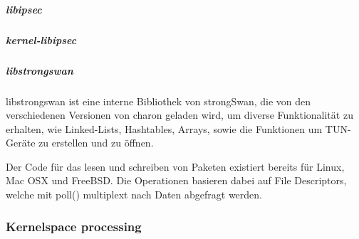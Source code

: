 \subparagraph{libipsec}
\subparagraph{kernel-libipsec}
\subparagraph{libstrongswan}
libstrongswan ist eine interne Bibliothek von strongSwan, die von den verschiedenen
Versionen von charon geladen wird, um diverse Funktionalität zu erhalten, wie
Linked-Lists, Hashtables, Arrays, sowie die Funktionen um TUN-Geräte zu erstellen und zu öffnen.

Der Code für das lesen und schreiben von Paketen existiert bereits für Linux, Mac OSX
und FreeBSD.
Die Operationen basieren dabei auf File Descriptors, welche mit poll() multiplext nach
Daten abgefragt werden.


\subsubsection{Kernelspace processing}

